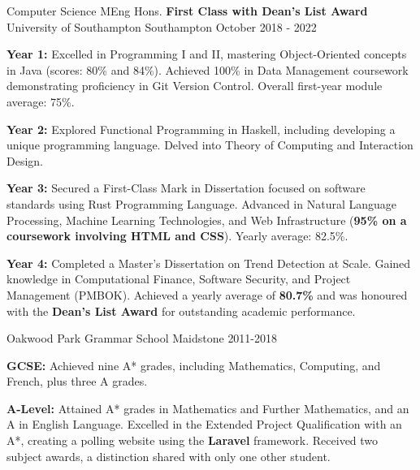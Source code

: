 \begin{cventries}
  \cventry
    {Computer Science MEng Hons. \textbf{First Class with Dean's List Award}} %
    {University of Southampton} %
    {Southampton} %
    {October 2018 - 2022 } %
    {
      \begin{cvitems} %
        \item {\textbf{Year 1:} Excelled in Programming I and II, mastering Object-Oriented concepts in Java (scores: 80\% and 84\%). Achieved 100\% in Data Management coursework demonstrating proficiency in Git Version Control. Overall first-year module average: 75\%.}
        \vspace{0.5mm}
        \item {\textbf{Year 2:} Explored Functional Programming in Haskell, including developing a unique programming language. Delved into Theory of Computing and Interaction Design.}
        \item {\textbf{Year 3:} Secured a First-Class Mark in Dissertation focused on software standards using Rust Programming Language. Advanced in Natural Language Processing, Machine Learning Technologies, and Web Infrastructure (\textbf{95\% on a coursework involving HTML and CSS}). Yearly average: 82.5\%.}
        \item {\textbf{Year 4:} Completed a Master's Dissertation on Trend Detection at Scale. Gained knowledge in Computational Finance, Software Security, and Project Management (PMBOK). Achieved a yearly average of \textbf{80.7\%} and was honoured with the \textbf{Dean's List Award} for outstanding academic performance.}
      \end{cvitems}
    }
  \cventry
    {}
    {Oakwood Park Grammar School}
    {Maidstone}
    {2011-2018}
    {
      \begin{cvitems} %
        \item {\textbf{GCSE:} Achieved nine A* grades, including Mathematics, Computing, and French, plus three A grades.}
        \vspace{0.5mm}
        \item {\textbf{A-Level:} Attained A* grades in Mathematics and Further Mathematics, and an A in English Language. Excelled in the Extended Project Qualification with an A*, creating a polling website using the \textbf{Laravel} framework. Received two subject awards, a distinction shared with only one other student.}
      \end{cvitems}
    }
\end{cventries}

